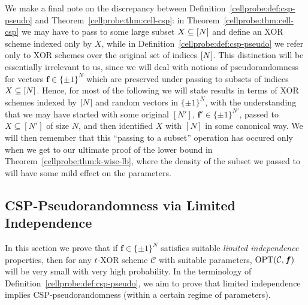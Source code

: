 We make a final note on the discrepancy between Definition~\ref{cellprobe:def:csp-pseudo} and Theorem~\ref{cellprobe:thm:cell-csp}: in Theorem~\ref{cellprobe:thm:cell-csp} we may have to pass to some large subset $X \subseteq [N]$ and define an XOR scheme indexed only by $X$, while in Definition~\ref{cellprobe:def:csp-pseudo} we refer only to XOR schemes over the original set of indices $[N]$. This distinction will be essentially irrelevant to us, since we will deal with notions of pseudorandomness for vectors $\bm{f} \in \{\pm 1\}^N$ which are preserved under passing to subsets of indices $X \subseteq [N]$. Hence, for most of the following we will state results in terms of XOR schemes indexed by $[N]$ and random vectors in $\{\pm 1\}^N$, with the understanding that we may have started with some original $[N']$, $\bm{f}' \in \{\pm 1\}^{N'}$, passed to $X \subseteq [N']$ of size $N$, and then identified $X$ with $[N]$ in some canonical way. We will then remember that this ``passing to a subset'' operation has occured only when we get to our ultimate proof of the lower bound in Theorem~\ref{cellprobe:thm:k-wise-lb}, where the density of the subset we passed to will have some mild effect on the parameters.

\subsection{CSP-Pseudorandomness via Limited Independence}\label{cellprobe:subsec:k-wise-lbs}
In this section we prove that if $\bm{f} \in \{\pm 1\}^N$ satisfies suitable \emph{limited independence} properties, then for any $t$-XOR scheme $\mathcal{C}$ with suitable parameters, $\mathrm{OPT}(\mathcal{C},\bm{f})$ will be very small with very high probability.
In the terminology of Definition~\ref{cellprobe:def:csp-pseudo}, we aim to prove that limited independence implies CSP-pseudorandomness (within a certain regime of parameters). 

